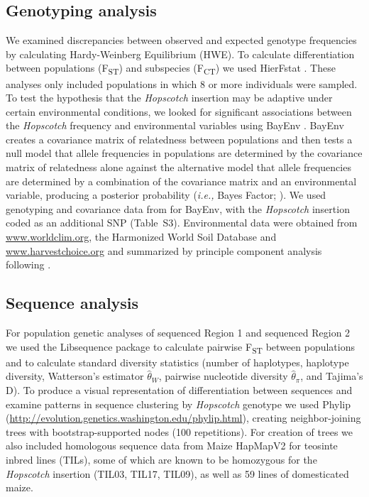 \documentclass[11pt]{article}
\begin{document}
\begin{linenumbers}
\begin{flushleft}
\subsection*{Genotyping analysis}

We examined discrepancies between observed and expected genotype frequencies by calculating Hardy-Weinberg Equilibrium (HWE).  To calculate differentiation between populations (F\textsubscript{ST}) and subspecies (F\textsubscript{CT}) we used HierFstat \citep{Goudet2005}. These analyses only included populations in which 8 or more individuals were sampled. To test the hypothesis that the \emph{Hopscotch} insertion may be adaptive under certain environmental conditions, we looked for significant associations between the \emph{Hopscotch} frequency and environmental variables using BayEnv \citep{Coop2010}. BayEnv creates a covariance matrix of relatedness between populations and then tests a null model that allele frequencies in populations are determined by the covariance matrix of relatedness alone against the alternative model that allele frequencies are determined by a combination of the covariance matrix and an environmental variable, producing a posterior probability (\emph{i.e.,} Bayes Factor; \citealt{Coop2010}). We used genotyping and covariance data from \citet{Pyhajarvi2013} for BayEnv, with the \emph{Hopscotch} insertion coded as an additional SNP (Table~S3). Environmental data were obtained from \url{www.worldclim.org}, the Harmonized World Soil Database \citep{FAOHWSD} and \url{www.harvestchoice.org} and summarized by principle component analysis following \citet{Pyhajarvi2013}.

\subsection*{Sequence analysis}

For population genetic analyses of sequenced Region 1 and sequenced Region 2 we used the  Libsequence package \citep{Thornton2003} to calculate pairwise F\textsubscript{ST} between populations and to calculate standard diversity statistics (number of haplotypes, haplotype diversity, Watterson's estimator $\hat\theta_W$, pairwise nucleotide diversity $\hat\theta_\pi$, and Tajima's D). To produce a visual representation of differentiation between sequences and examine patterns in sequence clustering by \emph{Hopscotch} genotype we used Phylip (\url{http://evolution.genetics.washington.edu/phylip.html}), creating neighbor-joining trees with bootstrap-supported nodes (100 repetitions). For creation of trees we also included homologous sequence data from Maize HapMapV2 \citep{Chia2012} for teosinte inbred lines (TILs), some of which are known to be homozygous for the \emph{Hopscotch} insertion (TIL03, TIL17, TIL09), as well as 59 lines of domesticated maize.


\end{flushleft}
\end{linenumbers}
\end{document}
